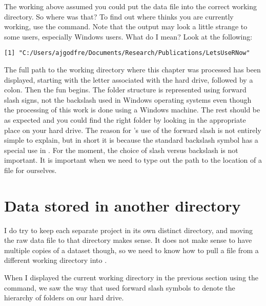 The working above assumed you could put the data file into the correct working directory.  So where was that? To find out where \R{} thinks you are currently working, use the  command. Note that the output may look a little strange to some users, especially Windows users. What do I mean? Look at the following: 
\begin{knitrout}
\color{fgcolor}\begin{kframe}
\begin{alltt}
\hlstd{> }\hlstd{()}
\end{alltt}
\begin{verbatim}
[1] "C:/Users/ajgodfre/Documents/Research/Publications/LetsUseRNow"
\end{verbatim}
\end{kframe}
\end{knitrout}
 
The full path to the working directory where this chapter was processed has been displayed, starting with the letter associated with the hard drive, followed by a colon. Then the fun begins. The folder structure is represented using forward slash signs, not the backslash used in Windows operating systems even though the processing of this work is done using a Windows machine. The rest should be as expected and you could find the right folder by looking in the appropriate place on your hard drive. The reason for \R{}'s use of the forward slash is not entirely simple to explain, but in short it is because the standard backslash symbol has a special use  in \R{}. For the moment, the choice of slash versus backslash is not important. It is important when we need to type out the path to the location of a file for ourselves. 
 
 
 
\section{Data stored in another directory} 
 
 
I do try to keep each separate project in its own distinct directory, and moving the raw data file to that directory makes sense. It does not make sense to have multiple copies of a dataset though, so we need to know how to pull a file from a different working directory into \R{}. 
 
When I displayed the current working directory in the previous section using the  command, we saw the way that \R{} used forward slash symbols to denote the hierarchy of folders on our hard drive. 
 
